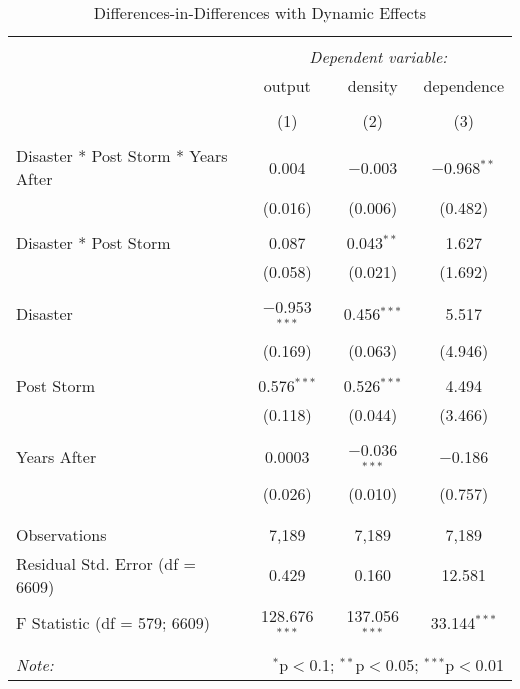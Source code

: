 
\begin{table}[!htbp] \centering 
  \caption{Differences-in-Differences with Dynamic Effects} 
  \label{} 
\small 
\begin{tabular}{@{\extracolsep{5pt}}lccc} 
\\[-1.8ex]\hline 
\hline \\[-1.8ex] 
 & \multicolumn{3}{c}{\textit{Dependent variable:}} \\ 
\cline{2-4} 
 & output & density & dependence \\ 
\\[-1.8ex] & (1) & (2) & (3)\\ 
\hline \\[-1.8ex] 
 Disaster * Post Storm * Years After & 0.004 & $-$0.003 & $-$0.968$^{**}$ \\ 
  & (0.016) & (0.006) & (0.482) \\ 
  & & & \\ 
 Disaster * Post Storm & 0.087 & 0.043$^{**}$ & 1.627 \\ 
  & (0.058) & (0.021) & (1.692) \\ 
  & & & \\ 
 Disaster & $-$0.953$^{***}$ & 0.456$^{***}$ & 5.517 \\ 
  & (0.169) & (0.063) & (4.946) \\ 
  & & & \\ 
 Post Storm & 0.576$^{***}$ & 0.526$^{***}$ & 4.494 \\ 
  & (0.118) & (0.044) & (3.466) \\ 
  & & & \\ 
 Years After & 0.0003 & $-$0.036$^{***}$ & $-$0.186 \\ 
  & (0.026) & (0.010) & (0.757) \\ 
  & & & \\ 
\hline \\[-1.8ex] 
Observations & 7,189 & 7,189 & 7,189 \\ 
Residual Std. Error (df = 6609) & 0.429 & 0.160 & 12.581 \\ 
F Statistic (df = 579; 6609) & 128.676$^{***}$ & 137.056$^{***}$ & 33.144$^{***}$ \\ 
\hline 
\hline \\[-1.8ex] 
\textit{Note:}  & \multicolumn{3}{r}{$^{*}$p$<$0.1; $^{**}$p$<$0.05; $^{***}$p$<$0.01} \\ 
\end{tabular} 
\end{table} 
